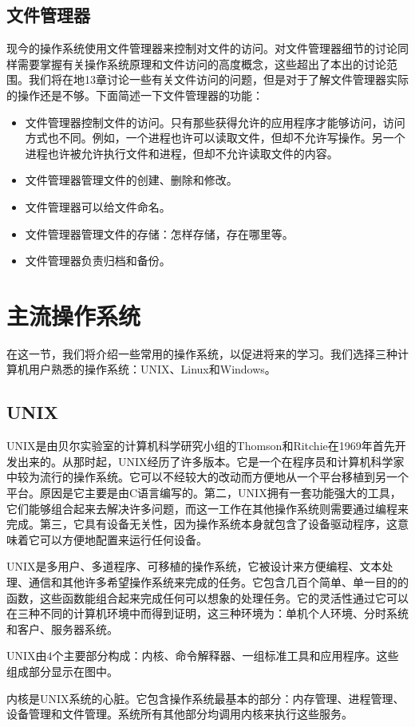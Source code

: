 \subsection{文件管理器}
现今的操作系统使用文件管理器来控制对文件的访问。对文件管理器细节的讨论同样需要掌握有关操作系统原理和文件访问的高度概念，这些超出了本出的讨论范围。我们将在地13章讨论一些有关文件访问的问题，但是对于了解文件管理器实际的操作还是不够。下面简述一下文件管理器的功能：
\begin{itemize}
	\item 文件管理器控制文件的访问。只有那些获得允许的应用程序才能够访问，访问方式也不同。例如，一个进程也许可以读取文件，但却不允许写操作。另一个进程也许被允许执行文件和进程，但却不允许读取文件的内容。
	\item 文件管理器管理文件的创建、删除和修改。
	\item 文件管理器可以给文件命名。
	\item 文件管理器管理文件的存储：怎样存储，存在哪里等。
	\item 文件管理器负责归档和备份。
\end{itemize}
\section{主流操作系统}
在这一节，我们将介绍一些常用的操作系统，以促进将来的学习。我们选择三种计算机用户熟悉的操作系统：UNIX、Linux和Windows。
\subsection{UNIX}
UNIX是由贝尔实验室的计算机科学研究小组的Thomson和Ritchie在1969年首先开发出来的。从那时起，UNIX经历了许多版本。它是一个在程序员和计算机科学家中较为流行的操作系统。它可以不经较大的改动而方便地从一个平台移植到另一个平台。原因是它主要是由C语言编写的。第二，UNIX拥有一套功能强大的工具，它们能够组合起来去解决许多问题，而这一工作在其他操作系统则需要通过编程来完成。第三，它具有设备无关性，因为操作系统本身就包含了设备驱动程序，这意味着它可以方便地配置来运行任何设备。

UNIX是多用户、多道程序、可移植的操作系统，它被设计来方便编程、文本处理、通信和其他许多希望操作系统来完成的任务。它包含几百个简单、单一目的的函数，这些函数能组合起来完成任何可以想象的处理任务。它的灵活性通过它可以在三种不同的计算机环境中而得到证明，这三种环境为：单机个人环境、分时系统和客户、服务器系统。

UNIX由4个主要部分构成：内核、命令解释器、一组标准工具和应用程序。这些组成部分显示在图中。

内核是UNIX系统的心脏。它包含操作系统最基本的部分：内存管理、进程管理、设备管理和文件管理。系统所有其他部分均调用内核来执行这些服务。

